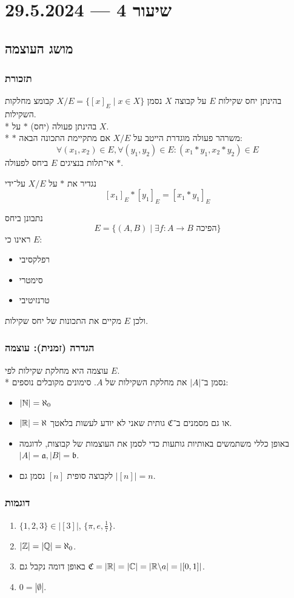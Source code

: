 \section{שיעור 4 --- 29.5.2024}
\subsection{מושג העוצמה}
\subsubsection{תזכורת}
בהינתן יחס שקילות $E$ על קבוצה $X$ נסמן $X/E = \{ {[x]}_E \mid x \in X\}$ קבומצ מחלקות השקילות. \\*
בהינתן פעולה (יחס) $*$ על $X$. \\*
$*$ משרהר פעולה מוגדרת הייטב על $X/E$ אם מתקיימת התכונה הבאה:
\[
	\forall (x_1, x_2) \in E, \forall (y_1, y_2) \in E : (x_1 * y_1, x_2 * y_2) \in E
\]
אי־תלות בנציגים $E$ ביחס לפעולה $*$.

נגדיר את $*$ על $X/E$ על־ידי
\[
	{[x_1]}_E * {[y_1]}_E = {[x_1 * y_1]}_E
\]

נתבונן ביחס
\[
	E = \{ (A, B) \mid \exists f : A \to B \text{ הפיכה} \}
\]
ראינו כי $E$:

\begin{itemize}
	\item רפלקסיבי
	\item סימטרי
	\item טרנזיטיבי
\end{itemize}
ולכן $E$ מקיים את התכונות של יחס שקילות.

\subsubsection{הגדרה (זמנית): עוצמה}
עוצמה היא מחלקת שקילות לפי $E$. \\*
נסמן ב־$|A|$ את מחלקת השקילות של $A$.
סימונים מקובלים נוספים:
\begin{itemize}
	\item $|\mathbb{N}| = \aleph_0$
	\item $|\mathbb{R}| = \aleph$ או גם מסמנים ב־$\mathfrak{C}$ גותית שאני לא יודע לעשות בלאטך.
	\item באופן כללי משתמשים באותיות גותעות כדי לסמן את העוצמות של קבוצות, לדוגמה $|A| = \mathfrak{a}, |B| = \mathfrak{b}$.
	\item לקבוצה סופית $[n]$ נסמן גם $|[n]| = n$.
\end{itemize}

\subsubsection{דוגמות}
\begin{enumerate}
	\item $\{1, 2, 3\} \in |[3]|$, $\{\pi, e, \frac{1}{7}\}$.
	\item $|\mathbb{Z}| = |\mathbb{Q}| = \aleph_0$.
	\item באופן דומה נקבל גם $\mathfrak{C} = |\mathbb{R}| = |\mathbb{C}| = |\mathbb{R}\backslash a| = |[0, 1]|$.
	\item $0 = |\emptyset|$.
\end{enumerate}


